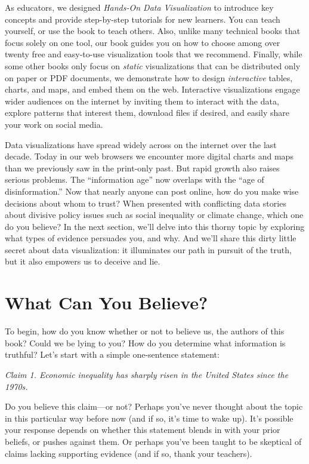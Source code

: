 \documentclass[
  english,
]{book}
\begin{document}
As educators, we designed \emph{Hands-On Data Visualization} to introduce key concepts and provide step-by-step tutorials for new learners. You can teach yourself, or use the book to teach others. Also, unlike many technical books that focus solely on one tool, our book guides you on how to choose among over twenty free and easy-to-use visualization tools that we recommend. Finally, while some other books only focus on \emph{static} visualizations that can be distributed only on paper or PDF documents, we demonstrate how to design \emph{interactive} tables, charts, and maps, and embed them on the web. Interactive visualizations engage wider audiences on the internet by inviting them to interact with the data, explore patterns that interest them, download files if desired, and easily share your work on social media.

Data visualizations have spread widely across on the internet over the last decade. Today in our web browsers we encounter more digital charts and maps than we previously saw in the print-only past. But rapid growth also raises serious problems. The ``information age'' now overlaps with the ``age of disinformation.'' Now that nearly anyone can post online, how do you make wise decisions about whom to trust? When presented with conflicting data stories about divisive policy issues such as social inequality or climate change, which one do you believe? In the next section, we'll delve into this thorny topic by exploring what types of evidence persuades you, and why. And we'll share this dirty little secret about data visualization: it illuminates our path in pursuit of the truth, but it also empowers us to deceive and lie.

\hypertarget{believe}{%
\section*{What Can You Believe?}\label{believe}}

To begin, how do you know whether or not to believe us, the authors of this book? Could we be lying to you? How do you determine what information is truthful? Let's start with a simple one-sentence statement:

\emph{Claim 1. Economic inequality has sharply risen in the United States since the 1970s.}

Do you believe this claim---or not? Perhaps you've never thought about the topic in this particular way before now (and if so, it's time to wake up). It's possible your response depends on whether this statement blends in with your prior beliefs, or pushes against them. Or perhaps you've been taught to be skeptical of claims lacking supporting evidence (and if so, thank your teachers).
\end{document}
